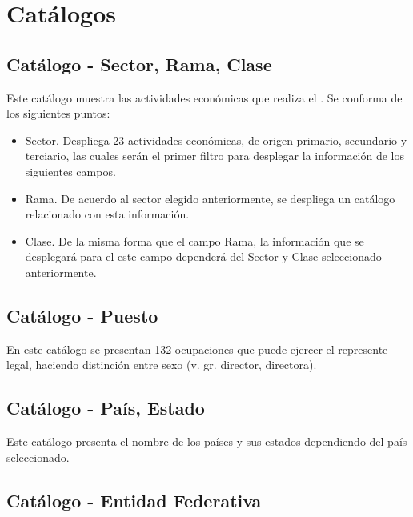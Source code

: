 \section{Catálogos}
\label{appendix:Catalogos}

\subsection{Catálogo - Sector, Rama, Clase}
\label{appendix:Catalogo:SectorRamaClase}

Este catálogo muestra las actividades económicas que realiza el . Se conforma de los siguientes puntos:

\begin{itemize}
	\item Sector. Despliega 23 actividades económicas, de origen primario, secundario y terciario, las cuales serán el primer filtro para desplegar la  información de los siguientes campos.
	\item Rama. De acuerdo al sector elegido anteriormente, se despliega un catálogo relacionado con esta información.
	\item Clase. De la misma forma que el campo Rama, la información que se desplegará para el este campo dependerá del Sector y Clase seleccionado anteriormente.
\end{itemize}


\subsection{Catálogo - Puesto}
\label{appendix:Catalogo:Puesto}

En este catálogo se presentan 132 ocupaciones que puede ejercer el represente legal, haciendo distinción entre sexo (v. gr. director, directora).



\subsection{Catálogo - País, Estado}
\label{appendix:Catalogo:PaisEstado}

Este catálogo presenta el nombre de los países y sus estados dependiendo del país seleccionado.



\subsection{Catálogo - Entidad Federativa}
\label{appendix:Catalogo:EntidadFederativa}

